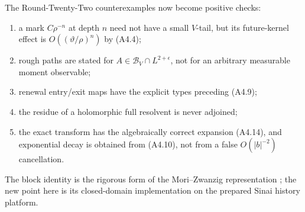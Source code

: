 The Round-Twenty-Two counterexamples now become positive checks:
\begin{enumerate}[label=(\roman*)]
\item a mark $C\rho^{-n}$ at depth $n$ need not have a small $V$-tail, but its
future-kernel effect is $O((\vartheta/\rho)^n)$ by (A4.4);
\item rough paths are stated for $A\in\mathcal B_V\cap L^{2+\epsilon}$, not for
an arbitrary measurable moment observable;
\item renewal entry/exit maps have the explicit types preceding (A4.9);
\item the residue of a holomorphic full resolvent is never adjoined;
\item the exact transform has the algebraically correct expansion (A4.14),
and exponential decay is obtained from (A4.10), not from a false
$O(|b|^{-2})$ cancellation.
\end{enumerate}
The block identity is the rigorous form of the Mori--Zwanzig representation
\cite{Mori1965,Zwanzig1961,ChorinHaldKupferman2000}; the new point here is its
closed-domain implementation on the prepared Sinai history platform.
